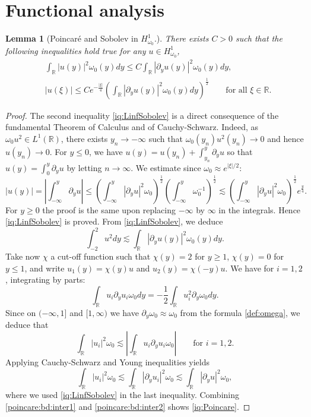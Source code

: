 \documentclass[11pt]{aims}
\newtheorem{lemma}[theorem]{Lemma}
\theoremstyle{definition}
\newcommand{\pa}{\partial}
\newcommand{\be}{\begin{equation}}
\newcommand{\ee}{\end{equation}}
\numberwithin{equation}{section}
\begin{document}
\appendix 

\section{Functional analysis} \label{ap:1}

\begin{lemma}[Poincar\'e and Sobolev in $H^1_{\omega_0}$.] \label{lemm:Poincare}
There exists $C>0$ such that the following inequalities hold true for any $u\in H^1_{\omega_0}$,
\begin{align}\label{iq:Poincare}
& \int_{\mathbb R} |u(y)|^2 \omega_0 (y)dy\leq C\int_{\mathbb R} |\partial_y u(y)|^2\omega_0 (y)dy,\\
\label{iq:LinfSobolev}
& |u(\xi)| \leq Ce^{-\frac{|\xi|}{4}}  \left(\int_{\mathbb R} |\partial_y u(y)|^2 \omega_0 (y)dy\right)^{\frac 12} \qquad \mbox{for all }\xi\in \mathbb R.
\end{align}
\end{lemma}
\begin{proof}

The second inequality \eqref{iq:LinfSobolev} is a direct consequence of the fundamental Theorem of Calculus and of Cauchy-Schwarz. Indeed, as $\omega_0 u^2\in L^1(\mathbb R)$, there exists $y_n\to -\infty$ such that $\omega_0(y_n) u^2(y_n)\to 0$ and hence $u(y_n)\to 0$. For $y\leq 0$, we have $u(y)=u(y_n)+\int_{y_n}^y \pa_y u$ so that $u(y)=\int_{0}^y \pa_y u$ by letting $n\to \infty$. We estimate since $\omega_0\approx e^{|\xi|/2}$:
$$
|u(y)|=|\int_{-\infty}^y \pa_y u |\leq \left(\int_{-\infty}^y|\partial_y u|^2\omega_0 \right)^{\frac 12}  \left(\int_{-\infty}^{y} \omega_0^{-1} \right)^{\frac 12} \lesssim  \left(\int_{-\infty}^y|\partial_y u|^2\omega_0 \right)^{\frac 12} e^{\frac y4}.
$$
For $y\geq 0$ the proof is the same upon replacing $-\infty$ by $\infty$ in the integrals. Hence \eqref{iq:LinfSobolev} is proved. From \eqref{iq:LinfSobolev}, we deduce
\be \label{poincare:bd:inter1}
\int_{-2}^2 u^2dy \lesssim \int_{\mathbb R} |\partial_y u(y)|^2 \omega_0 (y)dy.
\ee
Take now $\chi$ a cut-off function such that $\chi(y)=2$ for $y\geq 1$, $\chi(y)=0$ for $y\leq 1$, and write $u_1(y)=\chi(y)u$ and $u_2(y)=\chi(-y)u$. We have for $i=1,2$, integrating by parts:
$$
\int_{\mathbb R} u_i \pa_y u_i \omega_0 dy=-\frac{1}{2} \int_{\mathbb R} u_i^2 \pa_y \omega_0dy.
$$
Since on $(-\infty,1]$ and $[1,\infty)$ we have $\pa_y\omega_0\approx \omega_0$ from the formula \eqref{def:omega}, we deduce that
$$
\int_{\mathbb R} |u_i|^2\omega_0 \lesssim \left| \int_{\mathbb R} u_i \pa_y u_i \omega_0\right| \qquad \mbox{for }i=1,2.
$$
Applying Cauchy-Schwarz and Young inequalities yields
\be \label{poincare:bd:inter2}
\int_{\mathbb R}|u_i|^2\omega_0 \lesssim \int_{\mathbb R}|\pa_y u_i|^2\omega_0 \lesssim \int_{\mathbb R}|\pa_y u|^2\omega_0,
\ee
where we used \eqref{iq:LinfSobolev} in the last inequality. Combining \eqref{poincare:bd:inter1} and \eqref{poincare:bd:inter2} shows \eqref{iq:Poincare}. \end{proof}
\end{document}
